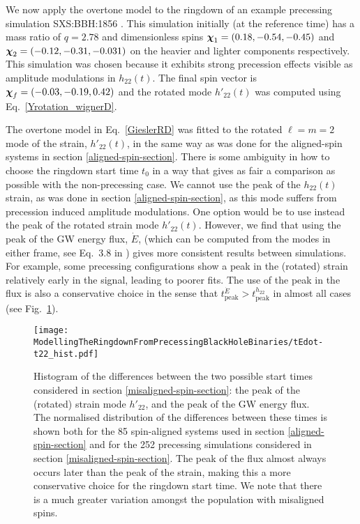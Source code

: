 We now apply the overtone model to the ringdown of an example precessing simulation SXS:BBH:1856 \cite{Varma:2019csw}. 
This simulation initially (at the reference time) has a mass ratio of $q=2.78$ and dimensionless spins $\vb*{\chi}_1=(0.18, -0.54, -0.45)$ and $\vb*{\chi}_2=(-0.12, -0.31, -0.031)$ on the heavier and lighter components respectively. This simulation was chosen because it exhibits strong precession effects visible as amplitude modulations in $h_{22}(t)$. The final spin vector is $\vb*{\chi}_f=(-0.03,-0.19,0.42)$ and the rotated mode $h'_{22}(t)$ was computed using Eq.~\ref{Yrotation_wignerD}.

The overtone model in Eq.~\ref{GieslerRD} was fitted to the rotated $\ell=m=2$ mode of the strain, $h'_{22}(t)$, in the same way as was done for the aligned-spin systems in section \ref{aligned-spin-section}.
There is some ambiguity in how to choose the ringdown start time $t_0$ in a way that gives as fair a comparison as possible with the non-precessing case.
We cannot use the peak of the $h_{22}(t)$ strain, as was done in section \ref{aligned-spin-section}, as this mode suffers from precession induced amplitude modulations. 
One option would be to use instead the peak of the rotated strain mode $h'_{22}(t)$.
However, we find that using the peak of the GW energy flux, $\dot{E}$, (which can be computed from the modes in either frame, see Eq.~3.8 in \cite{Ruiz:2007yx}) gives more consistent results between simulations. For example, some precessing configurations show a peak in the (rotated) strain relatively early in the signal, leading to poorer fits.
The use of the peak in the flux is also a conservative choice in the sense that $t_{\mathrm{peak}}^{\dot{E}} > t_{\mathrm{peak}}^{h_{22}}$ in almost all cases (see Fig.~\ref{tEdot-t22}).

\begin{figure}[t]
    \centering
    \texttt{[image: ModellingTheRingdownFromPrecessingBlackHoleBinaries/tEdot-t22\_hist.pdf]}
    \caption[Differences between the times of peak strain and peak GW energy flux]{  
    Histogram of the differences between the two possible start times considered in section \ref{misaligned-spin-section}: the peak of the (rotated) strain mode $h'_{22}$, and the peak of the GW energy flux.
    The normalised distribution of the differences between these times is shown both for the 85 spin-aligned systems used in section \ref{aligned-spin-section} and for the 252 precessing simulations considered in section \ref{misaligned-spin-section}. 
    The peak of the flux almost always occurs later than the peak of the strain, making this a more conservative choice for the ringdown start time. 
    We note that there is a much greater variation amongst the population with misaligned spins.
    }
    \label{tEdot-t22}
\end{figure}

